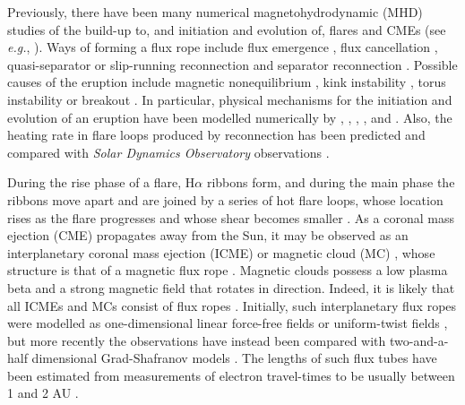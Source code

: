 \documentclass[10pt,namedreferneces]{SolarPhysics}
\begin{document}
\begin{article}
Previously, there have been many numerical magnetohydrodynamic (MHD) studies of the build-up to, and initiation and evolution of,  flares and CMEs (see \textit{e.g.}, ).  Ways of forming a flux rope include flux emergence \cite{archontis08a},  flux cancellation \cite{vanballegooijen89}, quasi-separator or slip-running reconnection \cite{aulanier10} and separator reconnection \cite{longcope07a}. Possible causes of the eruption include magnetic nonequilibrium \cite{priest90a,forbes91b,lin00}, kink instability \cite{hood79a,fan03,fan04,gibson04,torok04a}, torus instability \cite{kliem06,torok05} or breakout \cite{antiochos99a,devore08}.  In particular, physical mechanisms for the initiation and evolution of an eruption have been modelled numerically by , , , ,  and . Also, the heating rate in flare loops produced by reconnection has been predicted \cite{longcope10a} and compared with {\it Solar Dynamics Observatory} observations \cite{qiu12a,li14}.

During the rise phase of a flare, H$\alpha$ ribbons form, and during the main phase the ribbons move apart and are joined by a series of hot flare loops, whose location rises as the flare progresses and whose shear becomes smaller \cite{moore01,qiu10,cheng12}.  As a coronal mass ejection (CME) propagates away from the Sun, it may be observed as an interplanetary coronal mass ejection (ICME) or magnetic cloud (MC) \cite{burlaga82a,burlaga95,lepping90,lepping97}, whose structure is that of a magnetic flux rope \cite{webb00,demoulin08,vourlidas14}. Magnetic clouds possess a low plasma beta and a strong magnetic field that rotates in direction. Indeed, it is likely that all ICMEs and MCs consist of flux ropes \cite{gopalswamy13}.  Initially, such interplanetary flux ropes were modelled as one-dimensional linear force-free fields or uniform-twist fields \cite{farrugia99,dasso06},  but more recently the observations have instead been compared with two-and-a-half dimensional Grad-Shafranov models \cite{hu02,hu14}.  The lengths of such flux tubes have been estimated from measurements of electron travel-times  \cite{larson97,kahler11} to be usually between 1 and 2 AU \cite{hu15}.


\end{article}
\end{document}
